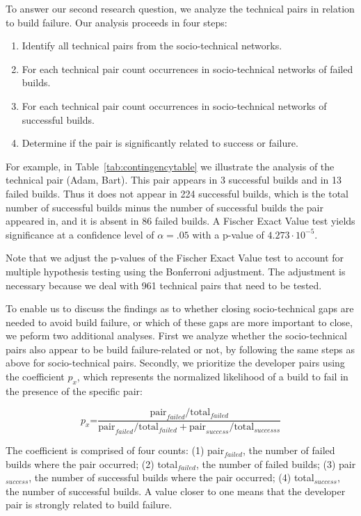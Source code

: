 \documentclass[12pt,oneside]{book}
\begin{document}
To answer our second research question, we analyze the
technical pairs in relation to build
failure. Our analysis proceeds in four steps:

\begin{enumerate}
\item Identify all technical pairs from the socio-technical networks.
\item For each technical pair count occurrences in socio-technical networks of
failed builds.
\item For each technical pair count occurrences in socio-technical networks of
successful builds.
\item Determine if the pair is significantly related to success or failure.
\end{enumerate}

For example, in Table~\ref{tab:contingencytable} we illustrate the analysis of
the technical pair (Adam, Bart). This pair appears in 3 successful builds and in
13 failed builds. Thus it does not appear in 224 successful builds, which is the total number of successful builds minus the number of successful builds the pair appeared in, and it is absent in 86 failed builds.
A Fischer Exact Value test yields significance at a confidence level of $\alpha = .05$ with a p-value of $4.273\cdot10^{-5}$.

Note that we adjust the p-values of the Fischer Exact Value test to account for multiple hypothesis testing using the Bonferroni adjustment.
The adjustment is necessary because we deal with 961 technical pairs that need to be tested. 

To enable us to discuss the findings as to whether closing socio-technical gaps
are needed to avoid build failure, or which of these gaps are more important to
close, we peform two additional analyses. 
First we analyze whether the
socio-technical pairs also appear to be build failure-related or not, by
following the same steps as above for socio-technical pairs. 
%
Secondly, we prioritize the developer pairs using the coefficient $p_x$,
which represents the normalized likelihood of a build
to fail in the presence of the specific pair:

\begin{equation}
p_x\text{=}\frac{ \text{pair}_{failed} / \text{total}_{failed} }
                     { \text{pair}_{failed} / \text{total}_{failed} + \text{pair}_{success} / \text{total}_{successs}}
\end{equation}

The coefficient is comprised of four counts: (1) pair$_{failed}$, the number of failed builds where the pair occurred; (2) total$_{failed}$, the number of failed builds; (3) pair$_{success}$, the number of successful builds where the pair occurred; (4) total$_{success}$, the number of successful builds.
A value closer to one means that the developer pair is strongly related to build
failure. %
\end{document}
